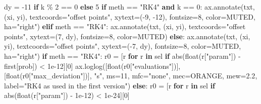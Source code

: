 \documentclass[
  10pt,
]{article}
\newenvironment{Shaded}{}{}
\newcommand{\BuiltInTok}[1]{\textcolor[rgb]{0.00,0.50,0.00}{#1}}
\newcommand{\ControlFlowTok}[1]{\textcolor[rgb]{0.00,0.44,0.13}{\textbf{#1}}}
\newcommand{\DecValTok}[1]{\textcolor[rgb]{0.25,0.63,0.44}{#1}}
\newcommand{\FloatTok}[1]{\textcolor[rgb]{0.25,0.63,0.44}{#1}}
\newcommand{\KeywordTok}[1]{\textcolor[rgb]{0.00,0.44,0.13}{\textbf{#1}}}
\newcommand{\NormalTok}[1]{#1}
\newcommand{\OperatorTok}[1]{\textcolor[rgb]{0.40,0.40,0.40}{#1}}
\newcommand{\StringTok}[1]{\textcolor[rgb]{0.25,0.44,0.63}{#1}}
\begin{document}
\begin{Shaded}
\begin{Highlighting}[]
\NormalTok{                dy }\OperatorTok{=} \OperatorTok{{-}}\DecValTok{11} \ControlFlowTok{if}\NormalTok{ k }\OperatorTok{\%} \DecValTok{2} \OperatorTok{==} \DecValTok{0} \ControlFlowTok{else} \DecValTok{5}
                \ControlFlowTok{if}\NormalTok{ meth }\OperatorTok{==} \StringTok{"RK4"} \KeywordTok{and}\NormalTok{ k }\OperatorTok{==} \DecValTok{0}\NormalTok{:}
\NormalTok{                    ax.annotate(txt, (xi, yi), textcoords}\OperatorTok{=}\StringTok{"offset points"}\NormalTok{, xytext}\OperatorTok{=}\NormalTok{(}\OperatorTok{{-}}\DecValTok{9}\NormalTok{, }\OperatorTok{{-}}\DecValTok{12}\NormalTok{), fontsize}\OperatorTok{=}\DecValTok{8}\NormalTok{, color}\OperatorTok{=}\NormalTok{MUTED, ha}\OperatorTok{=}\StringTok{"right"}\NormalTok{)}
                \ControlFlowTok{elif}\NormalTok{ meth }\OperatorTok{==} \StringTok{"RK4"}\NormalTok{:}
\NormalTok{                    ax.annotate(txt, (xi, yi), textcoords}\OperatorTok{=}\StringTok{"offset points"}\NormalTok{, xytext}\OperatorTok{=}\NormalTok{(}\DecValTok{7}\NormalTok{, dy), fontsize}\OperatorTok{=}\DecValTok{8}\NormalTok{, color}\OperatorTok{=}\NormalTok{MUTED)}
                \ControlFlowTok{else}\NormalTok{:}
\NormalTok{                    ax.annotate(txt, (xi, yi), textcoords}\OperatorTok{=}\StringTok{"offset points"}\NormalTok{, xytext}\OperatorTok{=}\NormalTok{(}\OperatorTok{{-}}\DecValTok{7}\NormalTok{, dy), fontsize}\OperatorTok{=}\DecValTok{8}\NormalTok{, color}\OperatorTok{=}\NormalTok{MUTED, ha}\OperatorTok{=}\StringTok{"right"}\NormalTok{)}
            \ControlFlowTok{if}\NormalTok{ meth }\OperatorTok{==} \StringTok{"RK4"}\NormalTok{:}
\NormalTok{                r0 }\OperatorTok{=}\NormalTok{ [r }\ControlFlowTok{for}\NormalTok{ r }\KeywordTok{in}\NormalTok{ sel }\ControlFlowTok{if} \BuiltInTok{abs}\NormalTok{(}\BuiltInTok{float}\NormalTok{(r[}\StringTok{"param"}\NormalTok{]) }\OperatorTok{{-}}\NormalTok{ first[prob]) }\OperatorTok{\textless{}} \FloatTok{1e{-}12}\NormalTok{][}\DecValTok{0}\NormalTok{]}
\NormalTok{                ax.loglog([}\BuiltInTok{float}\NormalTok{(r0[}\StringTok{"evaluations"}\NormalTok{])], [}\BuiltInTok{float}\NormalTok{(r0[}\StringTok{"max\_deviation"}\NormalTok{])], }\StringTok{"s"}\NormalTok{, ms}\OperatorTok{=}\DecValTok{11}\NormalTok{, mfc}\OperatorTok{=}\StringTok{"none"}\NormalTok{,}
\NormalTok{                          mec}\OperatorTok{=}\NormalTok{ORANGE, mew}\OperatorTok{=}\FloatTok{2.2}\NormalTok{, label}\OperatorTok{=}\StringTok{"RK4 as used in the first version"}\NormalTok{)}
            \ControlFlowTok{else}\NormalTok{:}
\NormalTok{                r0 }\OperatorTok{=}\NormalTok{ [r }\ControlFlowTok{for}\NormalTok{ r }\KeywordTok{in}\NormalTok{ sel }\ControlFlowTok{if} \BuiltInTok{abs}\NormalTok{(}\BuiltInTok{float}\NormalTok{(r[}\StringTok{"param"}\NormalTok{]) }\OperatorTok{{-}} \FloatTok{1e{-}12}\NormalTok{) }\OperatorTok{\textless{}} \FloatTok{1e{-}24}\NormalTok{][}\DecValTok{0}\NormalTok{]}

\end{Highlighting}
\end{Shaded}
\end{document}
